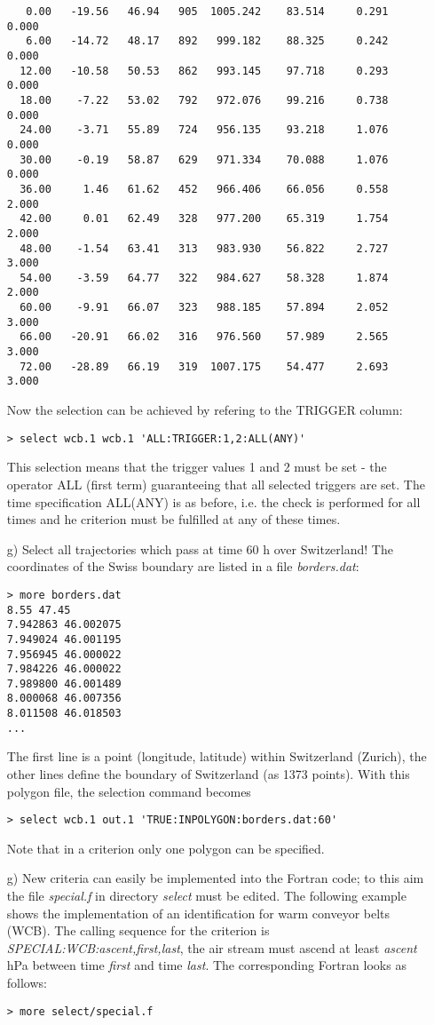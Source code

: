 \documentclass[a4paper,10pt]{article}
\begin{document}
\begin{itemize}
\begin{verbatim}
   0.00   -19.56   46.94   905  1005.242    83.514     0.291      0.000
   6.00   -14.72   48.17   892   999.182    88.325     0.242      0.000
  12.00   -10.58   50.53   862   993.145    97.718     0.293      0.000
  18.00    -7.22   53.02   792   972.076    99.216     0.738      0.000
  24.00    -3.71   55.89   724   956.135    93.218     1.076      0.000
  30.00    -0.19   58.87   629   971.334    70.088     1.076      0.000
  36.00     1.46   61.62   452   966.406    66.056     0.558      2.000
  42.00     0.01   62.49   328   977.200    65.319     1.754      2.000
  48.00    -1.54   63.41   313   983.930    56.822     2.727      3.000
  54.00    -3.59   64.77   322   984.627    58.328     1.874      2.000
  60.00    -9.91   66.07   323   988.185    57.894     2.052      3.000
  66.00   -20.91   66.02   316   976.560    57.989     2.565      3.000
  72.00   -28.89   66.19   319  1007.175    54.477     2.693      3.000
\end{verbatim}
Now the selection can be achieved by refering to the TRIGGER column:
\begin{verbatim}
> select wcb.1 wcb.1 'ALL:TRIGGER:1,2:ALL(ANY)'
\end{verbatim}
This selection means that the trigger values 1 and 2 must be set - the operator ALL (first term) guaranteeing that all selected triggers are set. The time specification ALL(ANY) is as before, i.e. the check is performed for all times and he criterion must be fulfilled at any of these times.\\

\item[g)] Select all trajectories which pass at time 60 h over Switzerland! The coordinates of the Swiss boundary are listed in a file {\em borders.dat}:
\begin{verbatim}
> more borders.dat
8.55 47.45
7.942863 46.002075
7.949024 46.001195
7.956945 46.000022
7.984226 46.000022
7.989800 46.001489
8.000068 46.007356
8.011508 46.018503
...
\end{verbatim}
The first line is a point (longitude, latitude) within Switzerland (Zurich), the other lines define the boundary of Switzerland (as 1373 points). With this polygon file, the selection command becomes
\begin{verbatim}
> select wcb.1 out.1 'TRUE:INPOLYGON:borders.dat:60'
\end{verbatim} 
Note that in a criterion only one polygon can be specified.

\item[g)] New criteria can easily be implemented into the Fortran code; to this aim the file {\em special.f} in directory {\em select} must be edited. The following example shows the implementation of an identification for warm conveyor belts (WCB). The calling sequence for the criterion is {\em SPECIAL:WCB:ascent,first,last}, the air stream must ascend at least {\em ascent} hPa between time {\em first} and time {\em last}. The corresponding Fortran looks as follows:
\begin{small}
\begin{verbatim}
> more select/special.f


\end{verbatim}
\end{small}
\end{itemize}
\end{document}
